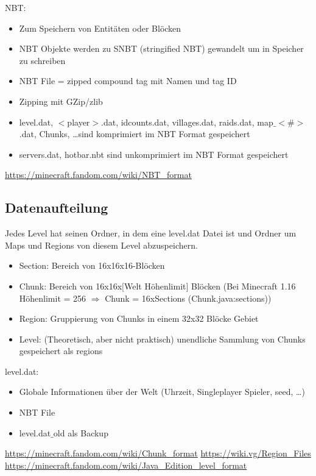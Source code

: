NBT:
\begin{itemize}
    \item Zum Speichern von Entitäten oder Blöcken
    \item NBT Objekte werden zu SNBT (stringified NBT) gewandelt um in Speicher zu schreiben 
    \item NBT File = zipped compound tag mit Namen und tag ID 
    \item Zipping mit GZip/zlib
    \item level.dat, $<$player$>$.dat, idcounts.dat, villages.dat, raids.dat, map$\_$$<$\#$>$.dat, Chunks, \dots sind komprimiert im NBT Format gespeichert
    \item servers.dat, hotbar.nbt sind unkomprimiert im NBT Format gespeichert
\end{itemize}
\url{https://minecraft.fandom.com/wiki/NBT_format}

\subsection{Datenaufteilung} \label{ssec:datenaufteilung}
Jedes Level hat seinen Ordner, in dem eine level.dat Datei ist und Ordner um Maps und Regions von diesem Level abzuspeichern. 

\begin{itemize}
    \item Section: Bereich von 16x16x16-Blöcken
    \item Chunk: Bereich von 16x16x$[$Welt Höhenlimit$]$ Blöcken (Bei Minecraft 1.16 Höhenlimit = 256 $\Rightarrow{}$ Chunk = 16xSections (Chunk.java:sections))
    \item Region: Gruppierung von Chunks in einem 32x32 Blöcke Gebiet
    \item Level: (Theoretisch, aber nicht praktisch) unendliche Sammlung von Chunks gespeichert als regions
\end{itemize}

level.dat:
\begin{itemize}
    \item Globale Informationen über der Welt (Uhrzeit, Singleplayer Spieler, seed, \dots)
    \item NBT File
    \item level.dat$\_$old als Backup
\end{itemize}

\url{https://minecraft.fandom.com/wiki/Chunk_format}
\url{https://wiki.vg/Region_Files}
\url{https://minecraft.fandom.com/wiki/Java_Edition_level_format}

